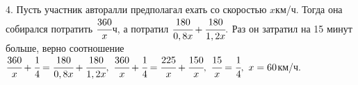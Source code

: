 4. Пусть участник авторалли предполагал ехать со скоростью $x$км/ч. Тогда она собирался потратить $\cfrac{360}{x}$ч, а потратил $\cfrac{180}{0,8x}+\cfrac{180}{1,2x}.$ Раз он затратил на 15 минут больше, верно соотношение $\cfrac{360}{x}+\cfrac{1}{4}=\cfrac{180}{0,8x}+\cfrac{180}{1,2x},\ \cfrac{360}{x}+\cfrac{1}{4}=\cfrac{225}{x}+\cfrac{150}{x},\ \cfrac{15}{x}=\cfrac{1}{4},\ x=60$км/ч.\\
